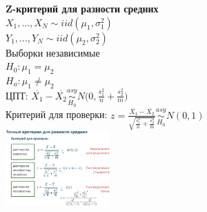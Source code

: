 \documentclass[10pt,landscape]{article}
\begin{document}
\begin{multicols}{3}
\textbf{Z-критерий для разности средних}\\
$X_1, ... , X_N \sim iid (\mu_1, \sigma^2_1)$\\
$Y_1, ... , Y_N \sim iid (\mu_2, \sigma^2_2)$\\
Выборки независимые \\
$H_0 : \mu_1 = \mu_2$\\
$H_a : \mu_1 \neq \mu_2$\\

ЦПТ: 
$\overline{X_1} - \overline{X_2} \underset{H_0}{\overset{asy}{\sim}} N\Big(0, \frac{s_1^2}{n}+\frac{s_2^2}{m}\Big)$\\
Критерий для проверки: $z = \frac{\overline{X_1} - \overline{X_2}}{\sqrt{\frac{s_1^2}{n}+\frac{s_2^2}{m}}}\underset{H_0}{\overset{asy}{\sim}} N(0,1) $\\
\includegraphics[width=0.3\textwidth]{Screenshot from 2021-09-04 10-53-10.png}
\\

\end{multicols}
\end{document}
